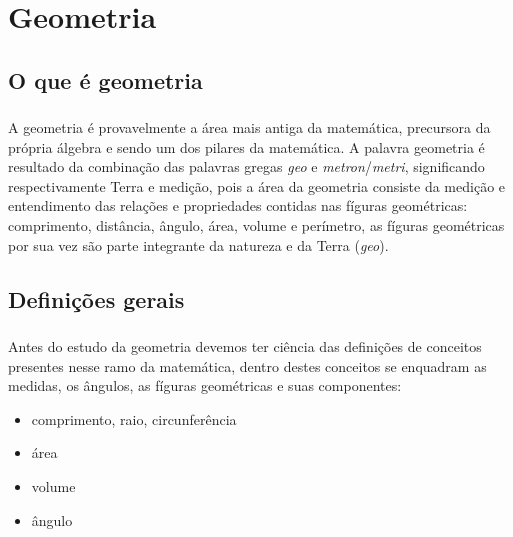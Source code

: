\documentclass{beamer}
\begin{document}

\section{Geometria}
\subsection{O que é geometria}
\begin{frame}\frametitle{\subsecname}
    A geometria é provavelmente a área mais antiga da matemática, precursora da própria álgebra e sendo um dos pilares
    da matemática. A palavra geometria é resultado da combinação das palavras gregas \textit{geo} e
    \textit{metron}/\textit{metri}, significando respectivamente Terra e medição, pois a área da geometria consiste da
    medição e entendimento das relações e propriedades  contidas nas fíguras geométricas: comprimento, distância, ângulo,
    área, volume e perímetro, as fíguras geométricas por sua vez são parte integrante da natureza e da Terra (\textit{geo}).
\end{frame}


\subsection{Definições gerais}
\begin{frame}\frametitle{\subsecname}
    Antes do estudo da geometria devemos ter ciência das definições de conceitos presentes nesse ramo da matemática,
    dentro destes conceitos se enquadram as medidas, os ângulos, as fíguras geométricas e suas componentes:
    \begin{itemize}
        \item comprimento, raio, circunferência
        \item área
        \item volume
        \item ângulo
    \end{itemize}
\end{frame}

\end{document}
